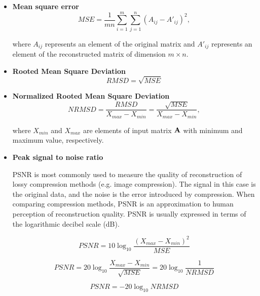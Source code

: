 \begin{itemize}
\item \textbf{Mean square error}
\begin{equation}
MSE=\frac{1}{m n} \sum_{i=1}^{m} \sum_{j=1}^{n} (A_{ij} - A'_{ij})^{2},
\label{eq:mse-def}
\end{equation}

\noindent
where $A_{ij}$ represents an element of the original matrix and $A'_{ij}$ represents an element of the
reconstructed matrix of dimension $m \times n$.

\item \textbf{Rooted Mean Square Deviation}
\begin{equation}
RMSD=\sqrt{MSE}
\label{eq:rmsd-def}
\end{equation}

\item \textbf{Normalized Rooted Mean Square Deviation}
\begin{equation}
NRMSD=\frac{RMSD}{X_{max}-X_{min}}=\frac{\sqrt{MSE}}{X_{max}-X_{min}},
\label{eq:nrmsd-def}
\end{equation}

\noindent
where $X_{min}$ and $X_{max}$ are elements of input matrix $\mathbf{A}$ with minimum and maximum value, respectively.

\item \textbf{Peak signal to noise ratio}

PSNR is most commonly used to measure the quality of reconstruction of lossy compression methods (e.g. image compression). The signal in this case is the original data, and the noise is the error introduced by compression. When comparing compression methods, PSNR is an approximation to human perception of reconstruction quality. PSNR is usually expressed in terms of the logarithmic decibel scale (dB).

\begin{equation}
PSNR=10\log_{10}\frac{(X_{max}-X_{min})^{2}}{MSE}
\end{equation}

\begin{equation}
PSNR=20\log_{10}\frac{X_{max}-X_{min}}{\sqrt{MSE}}=20\log_{10}\frac{1}{NRMSD}
\end{equation}

\begin{equation}
PSNR=-20\log_{10}NRMSD
\label{eq:psnr-def}
\end{equation}

\end{itemize}

